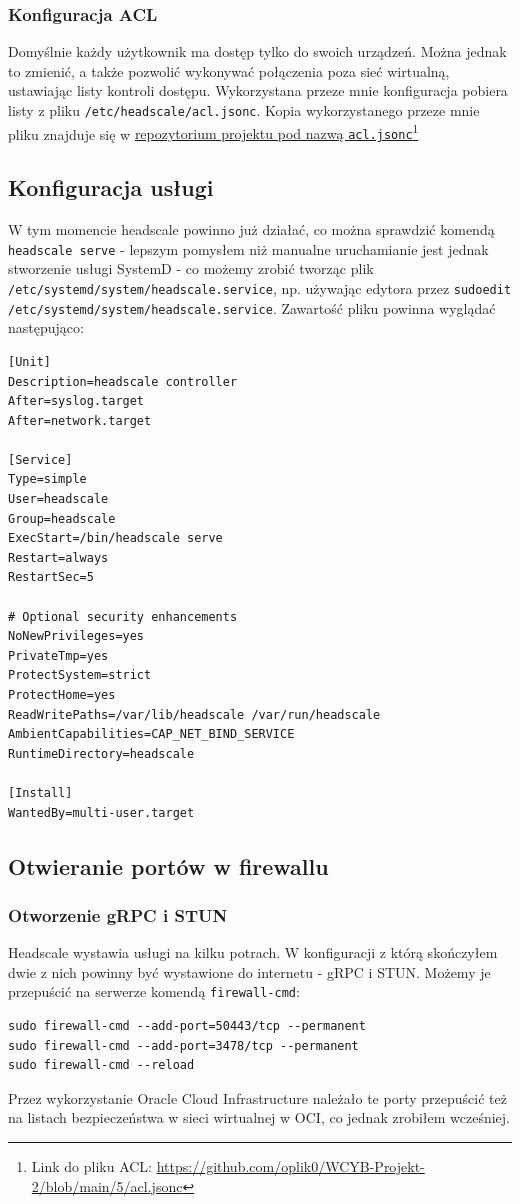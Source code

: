 \documentclass[../main.tex]{subfiles}
\begin{document}
\subsubsection{Konfiguracja ACL}
Domyślnie każdy użytkownik ma dostęp tylko do swoich urządzeń. Można jednak to zmienić, a także pozwolić wykonywać połączenia poza sieć wirtualną, ustawiając listy kontroli dostępu. Wykorzystana przeze mnie konfiguracja pobiera listy z pliku \texttt{/etc/headscale/acl.jsonc}. Kopia wykorzystanego przeze mnie pliku znajduje się w \href{https://github.com/oplik0/WCYB-Projekt-2/blob/main/5/acl.jsonc}{repozytorium projektu pod nazwą \texttt{acl.jsonc}}\footnote{Link do pliku ACL: \url{https://github.com/oplik0/WCYB-Projekt-2/blob/main/5/acl.jsonc}}
\begin{samepage}
\subsection{Konfiguracja usługi}
W tym momencie headscale powinno już działać, co można sprawdzić komendą \texttt{headscale serve} - lepszym pomysłem niż manualne uruchamianie jest jednak stworzenie usługi SystemD - co możemy zrobić tworząc plik \texttt{/etc/systemd/system/headscale.service}, np. używając edytora przez \texttt{sudoedit /etc/systemd/system/headscale.service}.
Zawartość pliku powinna wyglądać następująco:
\begin{verbatim}
[Unit]
Description=headscale controller
After=syslog.target
After=network.target

[Service]
Type=simple
User=headscale
Group=headscale
ExecStart=/bin/headscale serve
Restart=always
RestartSec=5

# Optional security enhancements
NoNewPrivileges=yes
PrivateTmp=yes
ProtectSystem=strict
ProtectHome=yes
ReadWritePaths=/var/lib/headscale /var/run/headscale
AmbientCapabilities=CAP_NET_BIND_SERVICE
RuntimeDirectory=headscale

[Install]
WantedBy=multi-user.target
\end{verbatim}
\end{samepage}

\subsection{Otwieranie portów w firewallu}
\subsubsection{Otworzenie gRPC i STUN}
Headscale wystawia usługi na kilku potrach. W konfiguracji z którą skończyłem dwie z nich powinny być wystawione do internetu - gRPC i STUN. Możemy je przepuścić na serwerze komendą \texttt{firewall-cmd}:
\begin{verbatim}
sudo firewall-cmd --add-port=50443/tcp --permanent
sudo firewall-cmd --add-port=3478/tcp --permanent
sudo firewall-cmd --reload
\end{verbatim}
Przez wykorzystanie Oracle Cloud Infrastructure należało te porty przepuścić też na listach bezpieczeństwa w sieci wirtualnej w OCI, co jednak zrobiłem wcześniej.
\end{document}
